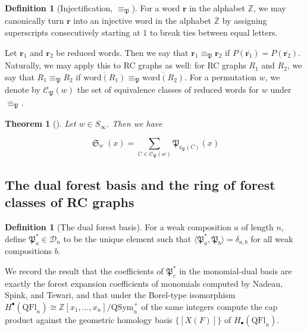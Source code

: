 \documentclass{amsart}
\newtheorem{theorem}{Theorem}[section]
\theoremstyle{definition}
\newtheorem{definition}[lemma]{Definition}
\theoremstyle{remark}
\numberwithin{equation}{subsection}
\DeclareMathOperator{\sch}{\mathfrak{S}}
\newcommand{\dcoma}{\mathcal{D}}
\newcommand{\code}{\mathfrak{c}}
\newcommand{\forest}{\mathfrak{P}}
\begin{document}
\begin{definition}[Injectification, $\equiv_\forest$]
  For a word $\mathbf{r}$ in the alphabet $\mathbb{Z}$, we may canonically turn $\mathbf{r}$ into an injective word in the alphabet $\overline{\mathbb{Z}}$ by assigning superscripts consecutively starting at $1$ to break ties between equal letters.

Let $\mathbf{r}_1$ and $\mathbf{r}_2$ be reduced words. Then we say that $\mathbf{r}_1\equiv_\forest\mathbf{r}_2$ if $P(\overline{\mathbf{r}_1}) = P(\overline{\mathbf{r}_2})$. Naturally, we may apply this to RC graphs as well: for RC graphs $R_1$ and $R_2$, we say that $R_1\equiv_\forest R_2$ if $\overline{\mathrm{word}(R_1)}\equiv_\forest \overline{\mathrm{word}(R_2)}$. For a permutation $w$, we denote by $\mathcal{C}_\forest(w)$ the set of equivalence classes of reduced words for $w$ under $\equiv_\forest$.
\end{definition}

\begin{theorem}[{\cite[Theorem~1.4]{nadeau2024forest}}] \label{theorem:forestforest}
  Let $w\in S_\infty$. Then we have

  $$\sch_w(x) = \sum_{C\in \mathcal{C}_\forest(w)} \forest_{\code_\forest(C)}(x)$$
\end{theorem}


\subsection{The dual forest basis and the ring of forest classes of RC graphs}

\begin{definition}[The dual forest basis]
  For a weak composition $a$ of length $n$, define $\forest_a^*\in \dcoma_n$ to be the unique element such that $\langle \forest_a^*, \forest_b\rangle = \delta_{a,b}$ for all weak compositions $b$.
\end{definition}

We record the result that the coefficients of $\forest^*_c$ in the monomial-dual basis are exactly the forest expansion coefficients of monomials computed by Nadeau, Spink, and Tewari, and that under the Borel-type isomorphism $H^\bullet(\mathrm{QFl}_n)\cong \mathbb{Z}[x_1,\ldots,x_n]/\mathrm{QSym}_n^+$ of \cite{bergeron2025qsymflag} the same integers compute the cap product against the geometric homology basis $\{[X(F)]\}$ of $H_\bullet(\mathrm{QFl}_n)$.
\end{document}
